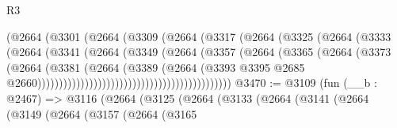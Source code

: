 \begin{lexlean}{R3}
\begin{coremodule}
                                          (@2664
                                            (@3301
                                              (@2664
                                                (@3309
                                                  (@2664
                                                    (@3317
                                                      (@2664
                                                        (@3325
                                                          (@2664
                                                            (@3333
                                                              (@2664
                                                                (@3341
                                                                  (@2664
                                                                    (@3349
                                                                      (@2664
                                                                        (@3357
                                                                          (@2664
                                                                            (@3365
                                                                              (@2664
                                                                                (@3373
                                                                                  (@2664
                                                                                    (@3381
                                                                                      (@2664
                                                                                        (@3389
                                                                                          (@2664
                                                                                            (@3393
                                                                                              @3395
                                                                                              @2685
                                                                                              @2660)))))))))))))))))))))))))))))))))))))))))))))
@3470 := @3109
    (fun (__b : @2467) =>
    @3116
      (@2664
        (@3125
          (@2664
            (@3133
              (@2664
                (@3141
                  (@2664
                    (@3149
                      (@2664
                        (@3157
                          (@2664
                            (@3165

\end{coremodule}
\end{lexlean}
